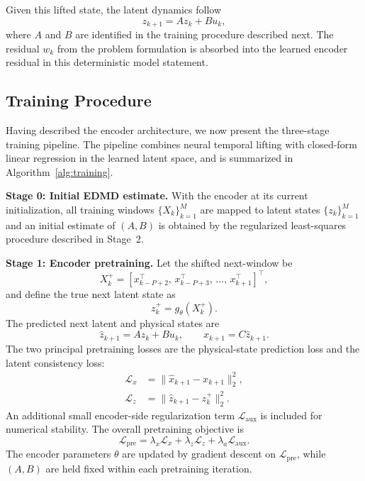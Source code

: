 \documentclass[journal]{IEEEtran}
\begin{document}
Given this lifted state, the latent dynamics follow
\begin{equation}
    z_{k+1} = A z_k + B u_k,
    \label{eq:temporal_dynamics}
\end{equation}
where $A$ and $B$ are identified in the training procedure described next. The residual $w_k$ from the problem formulation is absorbed into the learned encoder residual in this deterministic model statement.

\subsection{Training Procedure}
\label{sec:training}

Having described the encoder architecture, we now present the three-stage training pipeline. The pipeline combines neural temporal lifting with closed-form linear regression in the learned latent space, and is summarized in Algorithm~\ref{alg:training}.

\textbf{Stage 0: Initial EDMD estimate.}
With the encoder at its current initialization, all training windows $\{X_k\}_{k=1}^{M}$ are mapped to latent states $\{z_k\}_{k=1}^{M}$ and an initial estimate of $(A,B)$ is obtained by the regularized least-squares procedure described in Stage~2.

\textbf{Stage 1: Encoder pretraining.}
Let the shifted next-window be
\begin{equation}
    X_k^{+} = [x_{k-P+2}^\top,\,x_{k-P+3}^\top,\,\ldots,\,x_{k+1}^\top]^\top,
\end{equation}
and define the true next latent state as
\begin{equation}
    z_k^{+} = g_\theta(X_k^{+}).
\end{equation}
The predicted next latent and physical states are
\begin{equation}
    \hat{z}_{k+1} = Az_k + Bu_k,
    \qquad
    \hat{x}_{k+1} = C\hat{z}_{k+1}.
\end{equation}
The two principal pretraining losses are the physical-state prediction loss and the latent consistency loss:
\begin{align}
    \mathcal{L}_{x} &= \|\hat{x}_{k+1}-x_{k+1}\|_2^2,
    \label{eq:loss_x}\\
    \mathcal{L}_{z} &= \|\hat{z}_{k+1}-z_k^{+}\|_2^2.
    \label{eq:loss_z}
\end{align}
An additional small encoder-side regularization term $\mathcal{L}_{\mathrm{aux}}$ is included for numerical stability. The overall pretraining objective is
\begin{equation}
    \mathcal{L}_{\mathrm{pre}} = \lambda_x\mathcal{L}_x + \lambda_z\mathcal{L}_z + \lambda_a\mathcal{L}_{\mathrm{aux}}.
    \label{eq:pretraining_loss}
\end{equation}
The encoder parameters $\theta$ are updated by gradient descent on $\mathcal{L}_{\mathrm{pre}}$, while $(A,B)$ are held fixed within each pretraining iteration.
\end{document}
